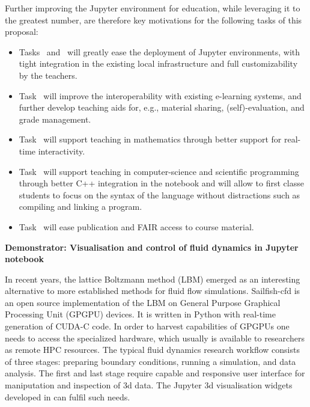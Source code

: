   Further improving the Jupyter environment for education, while
  leveraging it to the greatest number, are therefore key motivations
  for the following tasks of this proposal:
  \begin{itemize}
  \item Tasks~
    and~ will greatly ease the
    deployment of Jupyter environments, with tight integration in the
    existing local infrastructure and full customizability by the
    teachers.
  \item Task~ will improve the
    interoperability with existing e-learning systems, and further
    develop teaching aids for, e.g., material sharing,
    (self)-evaluation, and grade management.
  \item Task~ will support teaching
    in mathematics through better support for real-time interactivity.
  \item Task~ will support teaching
    in computer-science and scientific programming through
    better C++ integration in the notebook and will allow to first classe students to focus on the
    syntax of the language without distractions such as compiling and
    linking a program.
  \item Task~ will ease publication and FAIR
    access to course material.
  \end{itemize}

\medskip
\textbf{Demonstrator: Visualisation and control of fluid dynamics in Jupyter notebook}


In recent years, the lattice Boltzmann method (LBM) emerged as an
interesting alternative to more established methods for fluid flow
simulations. Sailfish-cfd \cite{januszewski2014sailfish} is an open
source implementation of the LBM on General Purpose Graphical Processing
Unit (GPGPU) devices. It is written in Python with real-time
generation of CUDA-C code.  In order to harvest capabilities of GPGPUs
one needs to access the specialized hardware, which usually is
available to researchers as remote HPC resources.  The typical fluid
dynamics research workflow consists of three stages: preparing
boundary conditions, running a simulation, and data analysis. The
first and last stage require capable and responsive user interface for
maniputation and inspection of 3d data.  The Jupyter 3d visualisation
widgets developed in  can fulfil
such needs.

